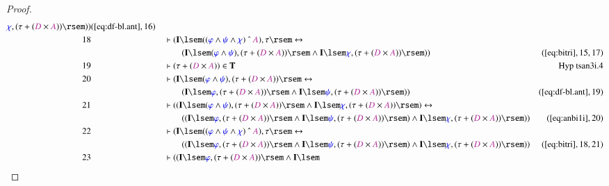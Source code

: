 \begin{proof}
\begin{align}
      \mw{\chi} , ( \tau + ( \mc{D} \times \mc{A} ) ) \rsem
      ) )&(\mbox{\ref{eq:df-bl.ant}},16)\notag
  \\ 18 &&  & \vdash ( \mathbf{I} \lsem ( ( \mw{\varphi} \wedge \mw{\psi}
      \wedge \mw{\chi} ) ~\string^~ \mc{A} ) , \tau \rsem
      \leftrightarrow  \notag \\ & & & \qquad
     ( \mathbf{I} \lsem ( \mw{\varphi}
      \wedge \mw{\psi} ) , ( \tau + ( \mc{D} \times \mc{A} )
      ) \rsem \wedge \mathbf{I} \lsem \mw{\chi} , ( \tau +
      ( \mc{D} \times \mc{A} ) ) \rsem )
      )&(\mbox{\ref{eq:bitri}},15,17)\notag
  \\ 19 &&  & \vdash ( \tau + ( \mc{D} \times \mc{A} ) ) \in
      \mathbf{T}&\text{Hyp~tsan3i.4}\notag%
  \\ 20 &&  & \vdash ( \mathbf{I} \lsem ( \mw{\varphi} \wedge \mw{\psi} ) , (
      \tau + ( \mc{D} \times \mc{A} ) ) \rsem
      \leftrightarrow  \notag \\ & & & \qquad
     ( \mathbf{I} \lsem \mw{\varphi} , (
      \tau + ( \mc{D} \times \mc{A} ) ) \rsem \wedge
      \mathbf{I} \lsem \mw{\psi} , ( \tau + ( \mc{D} \times
      \mc{A} ) ) \rsem )
      )&(\mbox{\ref{eq:df-bl.ant}},19)\notag
  \\ 21 &&  & \vdash ( ( \mathbf{I} \lsem ( \mw{\varphi} \wedge \mw{\psi} ) , (
      \tau + ( \mc{D} \times \mc{A} ) ) \rsem \wedge
      \mathbf{I} \lsem \mw{\chi} , ( \tau + ( \mc{D} \times
      \mc{A} ) ) \rsem ) \leftrightarrow \notag \\ & & & \qquad
      ( ( \mathbf{I}
      \lsem \mw{\varphi} , ( \tau + ( \mc{D} \times \mc{A} )
      ) \rsem \wedge \mathbf{I} \lsem \mw{\psi} , ( \tau +
      ( \mc{D} \times \mc{A} ) ) \rsem ) \wedge \mathbf{I}
      \lsem \mw{\chi} , ( \tau + ( \mc{D} \times \mc{A} ) )
      \rsem ) )&(\mbox{\ref{eq:anbi1i}},20)\notag
  \\ 22 &&  & \vdash ( \mathbf{I} \lsem ( ( \mw{\varphi} \wedge \mw{\psi}
      \wedge \mw{\chi} ) ~\string^~ \mc{A} ) , \tau \rsem
      \leftrightarrow  \notag \\ & & & \qquad
     ( ( \mathbf{I} \lsem \mw{\varphi} , (
      \tau + ( \mc{D} \times \mc{A} ) ) \rsem \wedge
      \mathbf{I} \lsem \mw{\psi} , ( \tau + ( \mc{D} \times
      \mc{A} ) ) \rsem ) \wedge \mathbf{I} \lsem \mw{\chi}
      , ( \tau + ( \mc{D} \times \mc{A} ) ) \rsem )
      )&(\mbox{\ref{eq:bitri}},18,21)\notag
  \\ 23 &&  & \vdash ( ( \mathbf{I} \lsem \mw{\varphi} , ( \tau + ( \mc{D}
      \times \mc{A} ) ) \rsem \wedge \mathbf{I} \lsem

\end{align}
\end{proof}
